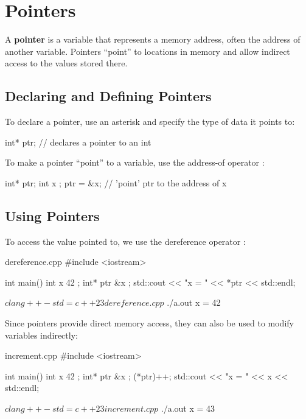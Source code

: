 \documentclass[12pt]{article}
\begin{document}
\tableofcontents

\pagebreak

\section{Pointers}

\noindent
A \textbf{pointer} is a variable that represents a memory address, often the address of another variable.
Pointers ``point'' to locations in memory and allow indirect access to the values stored there.

\subsection{Declaring and Defining Pointers}

\noindent
To declare a pointer, use an asterisk \inlinecxx{*} and specify the type of data it points to:

\begin{cxx}{}
int* ptr; // declares a pointer to an int
\end{cxx}

\noindent
To make a pointer ``point'' to a variable, use the address-of operator \inlinecxx{&}:

\begin{cxx}{}
int* ptr;
int x {};
ptr = &x; // 'point' ptr to the address of x
\end{cxx}

\subsection{Using Pointers}

\noindent
To access the value pointed to, we use the dereference operator \inlinecxx{*}:

\begin{cxx}{dereference.cpp}
#include <iostream>

int main()
{
	int x { 42 };
	int* ptr { &x };
	std::cout << "x = " << *ptr << std::endl;
}
\end{cxx}

\begin{terminal}
$ clang++ -std=c++23 dereference.cpp
$ ./a.out
x = 42
\end{terminal}

\noindent
Since pointers provide direct memory access, they can also be used to modify variables indirectly:

\begin{cxx}{increment.cpp}
#include <iostream>

int main()
{
	int x { 42 };
	int* ptr { &x };
	(*ptr)++;
	std::cout << "x = " << x << std::endl;
}
\end{cxx}

\begin{terminal}
$ clang++ -std=c++23 increment.cpp
$ ./a.out
x = 43
\end{terminal}
\end{document}
